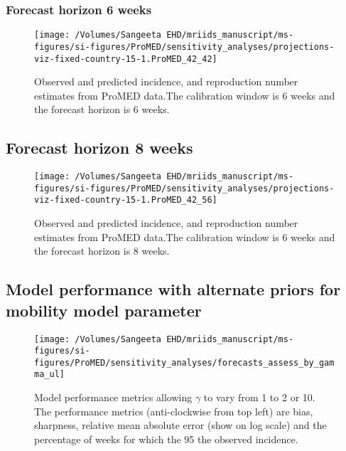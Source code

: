 \documentclass[9pt,twoside,lineno]{pnas-new}
\begin{document}
\hypertarget{forecast-horizon-6-weeks-11}{%
  \subsubsection{Forecast horizon 6 weeks}\label{forecast-horizon-6-weeks-11}}

\begin{figure}

  {\centering \texttt{[image: /Volumes/Sangeeta EHD/mriids\_manuscript/ms-figures/si-figures/ProMED/sensitivity\_analyses/projections-viz-fixed-country-15-1.ProMED\_42\_42]} 

  }
  \caption{Observed and predicted incidence, and reproduction number
    estimates from ProMED data.The calibration window is 6 weeks and
    the forecast horizon is 6 weeks.}
  \label{fig:pm66gamma}
\end{figure}

\hypertarget{forecast-horizon-8-weeks-11}{%
  \subsection{Forecast horizon 8 weeks}\label{forecast-horizon-8-weeks-11}}

\begin{figure}

  {
    \centering
    \texttt{[image: /Volumes/Sangeeta EHD/mriids\_manuscript/ms-figures/si-figures/ProMED/sensitivity\_analyses/projections-viz-fixed-country-15-1.ProMED\_42\_56]} 
  }
  \caption{Observed and predicted incidence, and reproduction number
    estimates from ProMED data.The calibration window is 6 weeks and
    the forecast horizon is 8 weeks.}
  \label{fig:pm68gamma}
\end{figure}

\hypertarget{model-performance-with-alternate-priors-for-mobility-model-parameter}{%
  \subsection{Model performance with alternate priors for mobility
    model parameter}\label{model-performance-with-alternate-priors-for-mobility-model-parameter}}

\begin{figure}
  {
    \centering
    \texttt{[image: /Volumes/Sangeeta EHD/mriids\_manuscript/ms-figures/si-figures/ProMED/sensitivity\_analyses/forecasts\_assess\_by\_gamma\_ul]} 
  }

  \caption{Model performance metrics allowing $\gamma$ to vary from
    1 to 2 or 10. The performance metrics (anti-clockwise from top left) are
    bias, sharpness, relative mean absolute error (show on log scale) and
    the percentage of weeks for which the 95%
    the observed incidence.}\label{fig:perfbygamma}
\end{figure}
\end{document}
